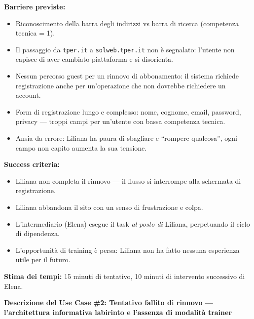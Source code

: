 \documentclass[11pt,a4paper]{article}
\begin{document}
\begin{tcolorbox}[colback=backgroundColor,colframe=borderColor,arc=2mm]
{    \textbf{Barriere previste:}
    \begin{itemize}
        \item Riconoscimento della barra degli indirizzi vs barra di ricerca (competenza tecnica = 1).
        \item Il passaggio da \texttt{tper.it} a \texttt{solweb.tper.it} non è segnalato: l'utente non capisce di aver cambiato piattaforma e si disorienta.
        \item Nessun percorso guest per un rinnovo di abbonamento: il sistema richiede registrazione anche per un'operazione che non dovrebbe richiedere un account.
        \item Form di registrazione lungo e complesso: nome, cognome, email, password, privacy --- troppi campi per un'utente con bassa competenza tecnica.
        \item Ansia da errore: Liliana ha paura di sbagliare e ``rompere qualcosa'', ogni campo non capito aumenta la sua tensione.
    \end{itemize}

    \textbf{Success criteria:}
    \begin{itemize}
        \item Liliana non completa il rinnovo --- il flusso si interrompe alla schermata di registrazione.
        \item Liliana abbandona il sito con un senso di frustrazione e colpa.
        \item L'intermediario (Elena) esegue il task \textit{al posto di} Liliana, perpetuando il ciclo di dipendenza.
        \item L'opportunità di training è persa: Liliana non ha fatto nessuna esperienza utile per il futuro.
    \end{itemize}

    \textbf{Stima dei tempi:} 15 minuti di tentativo, 10 minuti di intervento successivo di Elena.
    }
\end{tcolorbox}

\newpage


\begin{tcolorbox}[colback=primaryColor!10,colframe=primaryColor,arc=2mm]
    \textbf{Descrizione del Use Case \#2: Tentativo fallito di rinnovo --- l'architettura informativa labirinto e l'assenza di modalità trainer}
\end{tcolorbox}
\end{document}
